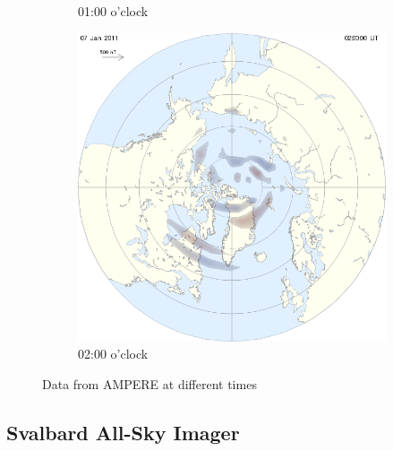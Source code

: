 \documentclass[10pt,a4paper]{article}
\begin{document}
\begin{figure}[h]
\begin{subfigure}{0.3\textwidth}
	\caption{ 01:00 o'clock \label{amp01}}
\end{subfigure}
\begin{subfigure}{0.3\textwidth}
\centering
	\includegraphics[width=\textwidth]{ampere8.png}
	\caption{ 02:00 o'clock \label{amp02}}
\end{subfigure}
\caption{Data from AMPERE at different times}
\end{figure}



\subsection{Svalbard All-Sky Imager \label{0_CHAPTER_SVALBARDIM}}
\end{document}
